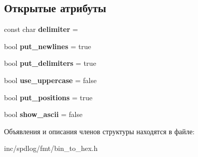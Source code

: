 \subsection*{Открытые атрибуты}
\begin{DoxyCompactItemize}
\item 
\mbox{\label{structfmt_1_1formatter_3_01spdlog_1_1details_1_1dump__info_3_01T_01_4_01_4_a983179e358a18de37741ae6846c93d8e}} 
const char {\bfseries delimiter} = \textquotesingle{} \textquotesingle{}
\item 
\mbox{\label{structfmt_1_1formatter_3_01spdlog_1_1details_1_1dump__info_3_01T_01_4_01_4_a76691d29a48923263309ee54ce16840f}} 
bool {\bfseries put\+\_\+newlines} = true
\item 
\mbox{\label{structfmt_1_1formatter_3_01spdlog_1_1details_1_1dump__info_3_01T_01_4_01_4_a89d1701aa912ee1632657a901ee038ec}} 
bool {\bfseries put\+\_\+delimiters} = true
\item 
\mbox{\label{structfmt_1_1formatter_3_01spdlog_1_1details_1_1dump__info_3_01T_01_4_01_4_a3f69876224325b1d067e4d945347f831}} 
bool {\bfseries use\+\_\+uppercase} = false
\item 
\mbox{\label{structfmt_1_1formatter_3_01spdlog_1_1details_1_1dump__info_3_01T_01_4_01_4_a955171e314e00f6c812daa9f6f6dabce}} 
bool {\bfseries put\+\_\+positions} = true
\item 
\mbox{\label{structfmt_1_1formatter_3_01spdlog_1_1details_1_1dump__info_3_01T_01_4_01_4_a0c934623a309b54a01f789a918860e3e}} 
bool {\bfseries show\+\_\+ascii} = false
\end{DoxyCompactItemize}


Объявления и описания членов структуры находятся в файле\+:\begin{DoxyCompactItemize}
\item 
inc/spdlog/fmt/bin\+\_\+to\+\_\+hex.\+h\end{DoxyCompactItemize}

